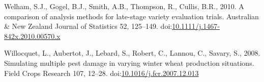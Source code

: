 \documentclass[a4paper]{article}
\begin{document}
\hypertarget{ref-Welham2010}{}
Welham, S.J., Gogel, B.J., Smith, A.B., Thompson, R., Cullis, B.R.,
2010. A comparison of analysis methods for late-stage variety evaluation
trials. Australian \& New Zealand Journal of Statistics 52, 125--149.
doi:\href{https://doi.org/10.1111/j.1467-842x.2010.00570.x}{10.1111/j.1467-842x.2010.00570.x}

\hypertarget{ref-Willocquet2008}{}
Willocquet, L., Aubertot, J., Lebard, S., Robert, C., Lannou, C.,
Savary, S., 2008. Simulating multiple pest damage in varying winter
wheat production situations. Field Crops Research 107, 12--28.
doi:\href{https://doi.org/10.1016/j.fcr.2007.12.013}{10.1016/j.fcr.2007.12.013}
\end{document}

